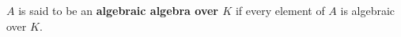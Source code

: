 $A$ is said to be an \textbf{algebraic algebra over $K$} if every element of $A$ is algebraic over $K$.
